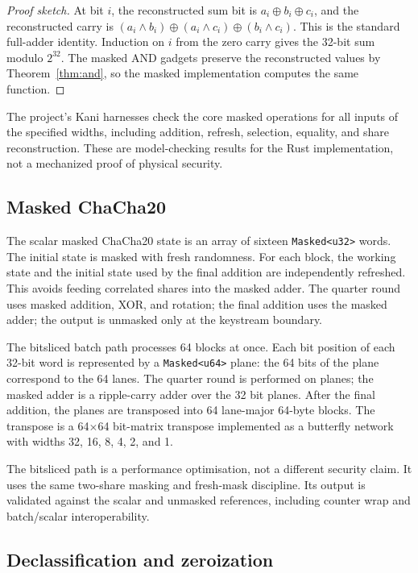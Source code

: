 \documentclass[11pt,a4paper]{article}
\newcommand{\code}[1]{\texttt{#1}}
\theoremstyle{plain}
\theoremstyle{definition}
\theoremstyle{remark}
\begin{document}
\begin{proof}[Proof sketch]
At bit \(i\), the reconstructed sum bit is \(a_i\oplus b_i\oplus c_i\), and the
reconstructed carry is \((a_i\wedge b_i)\oplus(a_i\wedge c_i)\oplus(b_i\wedge c_i)\).
This is the standard full-adder identity. Induction on \(i\) from the zero carry gives
the 32-bit sum modulo \(2^{32}\). The masked AND gadgets preserve the reconstructed
values by Theorem~\ref{thm:and}, so the masked implementation computes the same function.
\end{proof}

The project's Kani harnesses check the core masked operations for all inputs of the
specified widths, including addition, refresh, selection, equality, and share
reconstruction. These are model-checking results for the Rust implementation, not a
mechanized proof of physical security.

\subsection{Masked ChaCha20}

The scalar masked ChaCha20 state is an array of sixteen \code{Masked<u32>} words. The
initial state is masked with fresh randomness. For each block, the working state and
the initial state used by the final addition are independently refreshed. This avoids
feeding correlated shares into the masked adder. The quarter round uses masked
addition, XOR, and rotation; the final addition uses the masked adder; the output is
unmasked only at the keystream boundary.

The bitsliced batch path processes 64 blocks at once. Each bit position of each 32-bit
word is represented by a \code{Masked<u64>} plane: the 64 bits of the plane correspond
to the 64 lanes. The quarter round is performed on planes; the masked adder is a
ripple-carry adder over the 32 bit planes. After the final addition, the planes are
transposed into 64 lane-major 64-byte blocks. The transpose is a 64$\times$64 bit-matrix
transpose implemented as a butterfly network with widths 32, 16, 8, 4, 2, and 1.

The bitsliced path is a performance optimisation, not a different security claim. It
uses the same two-share masking and fresh-mask discipline. Its output is validated
against the scalar and unmasked references, including counter wrap and batch/scalar
interoperability.

\subsection{Declassification and zeroization}
\end{document}
